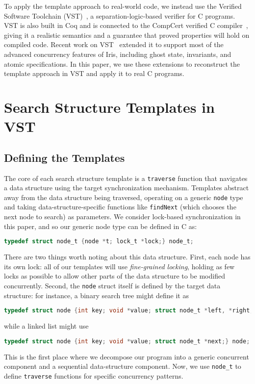 \documentclass[a4paper,UKenglish,cleveref, autoref, thm-restate]{lipics-v2021}
\begin{document}
To apply the template approach to real-world code, we instead use the Verified Software Toolchain (VST)~\cite{plcc}, a separation-logic-based verifier for C programs. VST is also built in Coq and is connected to the CompCert verified C compiler~\cite{compcert}, giving it a realistic semantics and a guarantee that proved properties will hold on compiled code. Recent work on VST~\cite{iris-vst-arxiv} extended it to support most of the advanced concurrency features of Iris, including ghost state, invariants, and atomic specifications. In this paper, we use these extensions to reconstruct the template approach in VST and apply it to real C programs. %

\section{Search Structure Templates in VST}

\subsection{Defining the Templates}
\label{templates}

The core of each search structure template is a \lstinline{traverse} function that navigates a data structure using the target synchronization mechanism. Templates abstract away from the data structure being traversed, operating on a generic \lstinline{node} type and taking data-structure-specific functions like \lstinline{findNext} (which chooses the next node to search) as parameters. We consider lock-based synchronization in this paper, and so our generic node type can be defined in C as:
\begin{lstlisting}[language = C, backgroundcolor=\color{white}, basicstyle=\ttfamily\footnotesize]
typedef struct node_t {node *t; lock_t *lock;} node_t;
\end{lstlisting}
There are two things worth noting about this data structure. First, each node has its own lock: all of our templates will use \emph{fine-grained locking}, holding as few locks as possible to allow other parts of the data structure to be modified concurrently. Second, the \lstinline{node} struct itself is defined by the target data structure: for instance, a binary search tree might define it as 
\begin{lstlisting}[language = C, backgroundcolor=\color{white}, basicstyle=\ttfamily\footnotesize]
typedef struct node {int key; void *value; struct node_t *left, *right;} node;
\end{lstlisting}
while a linked list might use
\begin{lstlisting}[language = C, backgroundcolor=\color{white}, basicstyle=\ttfamily\footnotesize]
typedef struct node {int key; void *value; struct node_t *next;} node;
\end{lstlisting}
This is the first place where we decompose our program into a generic concurrent component and a sequential data-structure component. Now, we use \lstinline{node_t} to define \lstinline{traverse} functions for specific concurrency patterns.
\end{document}
